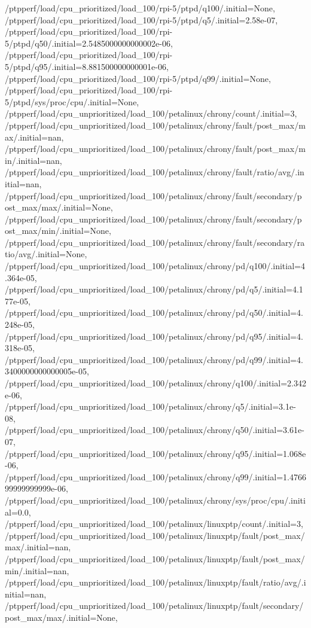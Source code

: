 {    /ptpperf/load/cpu_prioritized/load_100/rpi-5/ptpd/q100/.initial=None,
    /ptpperf/load/cpu_prioritized/load_100/rpi-5/ptpd/q5/.initial=2.58e-07,
    /ptpperf/load/cpu_prioritized/load_100/rpi-5/ptpd/q50/.initial=2.5485000000000002e-06,
    /ptpperf/load/cpu_prioritized/load_100/rpi-5/ptpd/q95/.initial=8.881500000000001e-06,
    /ptpperf/load/cpu_prioritized/load_100/rpi-5/ptpd/q99/.initial=None,
    /ptpperf/load/cpu_prioritized/load_100/rpi-5/ptpd/sys/proc/cpu/.initial=None,
    /ptpperf/load/cpu_unprioritized/load_100/petalinux/chrony/count/.initial=3,
    /ptpperf/load/cpu_unprioritized/load_100/petalinux/chrony/fault/post_max/max/.initial=nan,
    /ptpperf/load/cpu_unprioritized/load_100/petalinux/chrony/fault/post_max/min/.initial=nan,
    /ptpperf/load/cpu_unprioritized/load_100/petalinux/chrony/fault/ratio/avg/.initial=nan,
    /ptpperf/load/cpu_unprioritized/load_100/petalinux/chrony/fault/secondary/post_max/max/.initial=None,
    /ptpperf/load/cpu_unprioritized/load_100/petalinux/chrony/fault/secondary/post_max/min/.initial=None,
    /ptpperf/load/cpu_unprioritized/load_100/petalinux/chrony/fault/secondary/ratio/avg/.initial=None,
    /ptpperf/load/cpu_unprioritized/load_100/petalinux/chrony/pd/q100/.initial=4.364e-05,
    /ptpperf/load/cpu_unprioritized/load_100/petalinux/chrony/pd/q5/.initial=4.177e-05,
    /ptpperf/load/cpu_unprioritized/load_100/petalinux/chrony/pd/q50/.initial=4.248e-05,
    /ptpperf/load/cpu_unprioritized/load_100/petalinux/chrony/pd/q95/.initial=4.318e-05,
    /ptpperf/load/cpu_unprioritized/load_100/petalinux/chrony/pd/q99/.initial=4.3400000000000005e-05,
    /ptpperf/load/cpu_unprioritized/load_100/petalinux/chrony/q100/.initial=2.342e-06,
    /ptpperf/load/cpu_unprioritized/load_100/petalinux/chrony/q5/.initial=3.1e-08,
    /ptpperf/load/cpu_unprioritized/load_100/petalinux/chrony/q50/.initial=3.61e-07,
    /ptpperf/load/cpu_unprioritized/load_100/petalinux/chrony/q95/.initial=1.068e-06,
    /ptpperf/load/cpu_unprioritized/load_100/petalinux/chrony/q99/.initial=1.476699999999999e-06,
    /ptpperf/load/cpu_unprioritized/load_100/petalinux/chrony/sys/proc/cpu/.initial=0.0,
    /ptpperf/load/cpu_unprioritized/load_100/petalinux/linuxptp/count/.initial=3,
    /ptpperf/load/cpu_unprioritized/load_100/petalinux/linuxptp/fault/post_max/max/.initial=nan,
    /ptpperf/load/cpu_unprioritized/load_100/petalinux/linuxptp/fault/post_max/min/.initial=nan,
    /ptpperf/load/cpu_unprioritized/load_100/petalinux/linuxptp/fault/ratio/avg/.initial=nan,
    /ptpperf/load/cpu_unprioritized/load_100/petalinux/linuxptp/fault/secondary/post_max/max/.initial=None,
}
